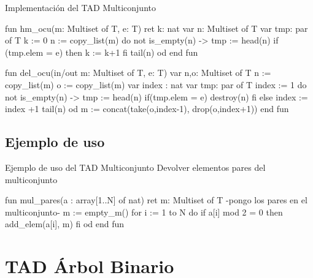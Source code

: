 \begin{codebox}{Implementación del TAD Multiconjunto}
\begin{pascallike}
fun hm_ocu(m: Multiset of T, e: T) ret k: nat
    var n: Multiset of T
    var tmp: par of T
    k := 0
    n := copy_list(m)
    do not is_empty(n) ->
        tmp := head(n)
        if (tmp.elem = e) then
            k := k+1
        fi
        tail(n)
    od
end fun

fun del_ocu(in/out m: Multiset of T, e: T)
    var n,o: Multiset of T
    n := copy_list(m)
    o := copy_list(m)
    var index : nat
    var tmp: par of T
    index := 1
    do not is_empty(n) ->
        tmp := head(n)
        if(tmp.elem = e) 
            destroy(n)
        fi
        else index := index +1
        tail(n)
    od
    m := concat(take(o,index-1), drop(o,index+1))
end fun
\end{pascallike}
\end{codebox}

\subsection{Ejemplo de uso}

\begin{codebox}{Ejemplo de uso del TAD Multiconjunto}
\footnotesize Devolver elementos pares del multiconjunto
\tcblower
\begin{pascallike}
fun mul_pares(a : array[1..N] of nat) ret m: Multiset of T
    {-pongo los pares en el multiconjunto-}
    m := empty_m()
    for i := 1 to N do
        if a[i] mod 2 = 0 then
            add_elem(a[i], m)
        fi
    od
end fun
\end{pascallike}
\end{codebox}

\section{TAD Árbol Binario}

